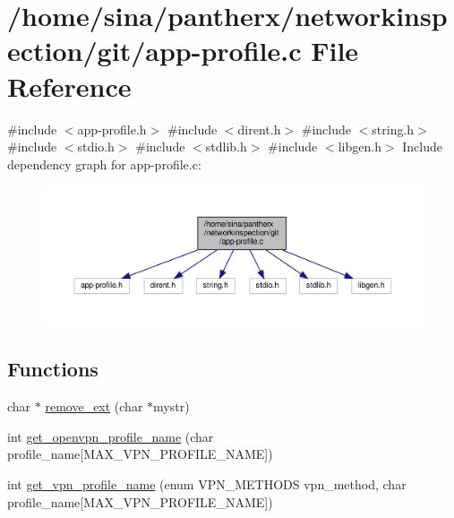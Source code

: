 \hypertarget{app-profile_8c}{}\section{/home/sina/pantherx/networkinspection/git/app-\/profile.c File Reference}
\label{app-profile_8c}
{\ttfamily \#include $<$app-\/profile.\+h$>$}\newline
{\ttfamily \#include $<$dirent.\+h$>$}\newline
{\ttfamily \#include $<$string.\+h$>$}\newline
{\ttfamily \#include $<$stdio.\+h$>$}\newline
{\ttfamily \#include $<$stdlib.\+h$>$}\newline
{\ttfamily \#include $<$libgen.\+h$>$}\newline
Include dependency graph for app-\/profile.c\+:\nopagebreak
\begin{figure}[H]
\begin{center}
\leavevmode
\includegraphics[width=350pt]{app-profile_8c__incl}
\end{center}
\end{figure}
\subsection*{Functions}
\begin{DoxyCompactItemize}
\item 
char $\ast$ \hyperlink{app-profile_8c_a59c7e3da3c5b7ecf10df2a5ef34b6953}{remove\+\_\+ext} (char $\ast$mystr)
\item 
int \hyperlink{app-profile_8c_a7ab4018359451259c67e57c83f9b7062}{get\+\_\+openvpn\+\_\+profile\+\_\+name} (char profile\+\_\+name\mbox{[}M\+A\+X\+\_\+\+V\+P\+N\+\_\+\+P\+R\+O\+F\+I\+L\+E\+\_\+\+N\+A\+ME\mbox{]})
\item 
int \hyperlink{app-profile_8c_aa32bea11cb1c8f99a45bc62cc8f5e455}{get\+\_\+vpn\+\_\+profile\+\_\+name} (enum V\+P\+N\+\_\+\+M\+E\+T\+H\+O\+DS vpn\+\_\+method, char profile\+\_\+name\mbox{[}M\+A\+X\+\_\+\+V\+P\+N\+\_\+\+P\+R\+O\+F\+I\+L\+E\+\_\+\+N\+A\+ME\mbox{]})
\end{DoxyCompactItemize}


